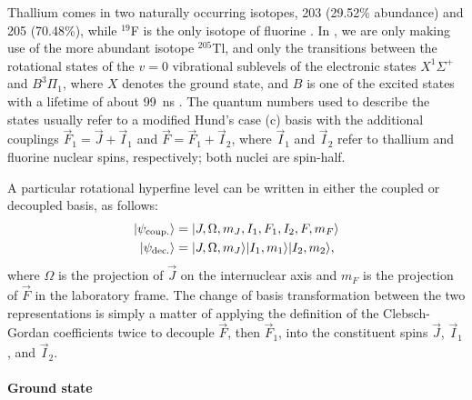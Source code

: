 Thallium comes in two naturally occurring isotopes, 203 (29.52\% abundance) and
205 (70.48\%), while $^{19}$F is the only isotope of fluorine \cite{awic2015}.
In \CENTREX, we are only making use of the more abundant isotope $^{205}$Tl, and
only the transitions between the rotational states of the $v=0$ vibrational
sublevels of the electronic states $X^1\Sigma^+$ and $B^3\Pi_1$, where $X$
denotes the ground state, and $B$ is one of the excited states with a lifetime
of about 99~ns \cite{norrgard2017hyperfine}. The quantum numbers used to
describe the states usually refer to a modified Hund's case (c) basis
\cite{brown2003rotational} with the additional couplings $\vec F_1=\vec J+\vec
I_1$ and $\vec F=\vec F_1+\vec I_2$, where $\vec I_1$ and $\vec I_2$ refer to
thallium and fluorine nuclear spins, respectively; both nuclei are spin-half.

A particular rotational hyperfine level can be written in either the coupled or
decoupled basis, as follows:
%
\begin{align*}
    |\psi_\text{coup.}\rangle &=
    |J,\Omega,m_J,I_1,F_1,I_2,F,m_F\rangle
    \\
    |\psi_\text{dec.}\rangle &=
    |J,\Omega,m_J\rangle
    |I_1,m_1\rangle
    |I_2,m_2\rangle,
\end{align*}
%
where $\Omega$ is the projection of $\vec J$ on the internuclear axis and $m_F$ is the
projection of $\vec F$ in the laboratory frame. \cite{norrgard2017hyperfine} The
change of basis transformation between the two representations is simply a
matter of applying the definition of the Clebsch-Gordan coefficients
\cite[eqn~5.77]{brown2003rotational} twice to decouple $\vec F$, then $\vec
F_1$, into the constituent spins $\vec J$, $\vec I_1$, and $\vec I_2$.

\paragraph{Ground state}

